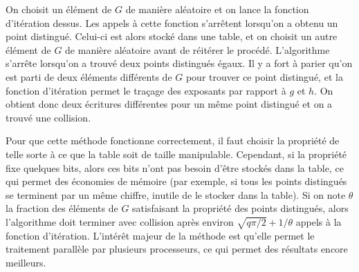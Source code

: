         On choisit un élément de $G$ de manière aléatoire et on lance la fonction d'itération dessus. Les appels à cette fonction s'arrêtent lorsqu'on a obtenu un point distingué. Celui-ci est alors stocké dans une table, et on choisit un autre élément de $G$ de manière aléatoire avant de réitérer le procédé. L'algorithme s'arrête lorsqu'on a trouvé deux points distingués égaux. Il y a fort à parier qu'on est parti de deux éléments différents de $G$ pour trouver ce point distingué, et la fonction d'itération permet le traçage des exposants par rapport à $g$ et $h$. On obtient donc deux écritures différentes pour un même point distingué et on a trouvé une collision.
        
        Pour que cette méthode fonctionne correctement, il faut choisir la propriété de telle sorte à ce que la table soit de taille manipulable. Cependant, si la propriété fixe quelques bits, alors ces bits n'ont pas besoin d'être stockés dans la table, ce qui permet des économies de mémoire (par exemple, si tous les points distingués se terminent par un même chiffre, inutile de le stocker dans la table). Si on note $\theta$ la fraction des éléments de $G$ satisfaisant la propriété des points distingués, alors l'algorithme doit terminer avec collision après environ $\sqrt{q\pi/2} + 1/\theta$ appels à la fonction d'itération. L'intérêt majeur de la méthode est qu'elle permet le traitement parallèle par plusieurs processeurs, ce qui permet des résultats encore meilleurs.